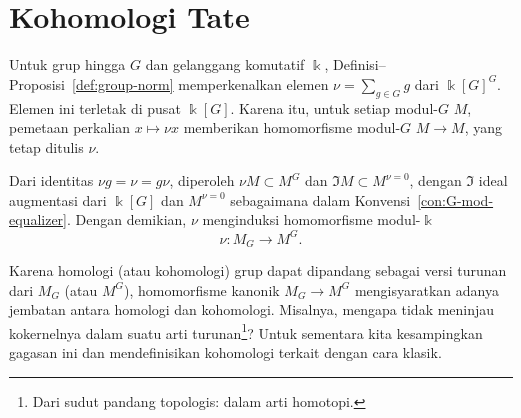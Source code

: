 
\section{Kohomologi Tate}\label{sec:Tate-coh}
\hypertarget{o014.aljabr2.chapter6.tate-cohomology}{ }

Untuk grup hingga $G$ dan gelanggang komutatif $\Bbbk$,
Definisi--Proposisi~\ref{def:group-norm} memperkenalkan elemen
$\nu = \sum_{g \in G} g$ dari $\Bbbk[G]^G$. Elemen ini terletak di pusat
$\Bbbk[G]$. Karena itu, untuk setiap modul-$G$ $M$, pemetaan perkalian
$x \mapsto \nu x$ memberikan homomorfisme modul-$G$ $M \to M$, yang tetap
ditulis $\nu$.

Dari identitas $\nu g = \nu = g \nu$, diperoleh
$\nu M \subset M^G$ dan $\mathfrak{I}M \subset M^{\nu = 0}$, dengan
$\mathfrak{I}$ ideal augmentasi dari $\Bbbk[G]$ dan $M^{\nu=0}$ sebagaimana
dalam Konvensi~\ref{con:G-mod-equalizer}. Dengan demikian, $\nu$ menginduksi
homomorfisme modul-$\Bbbk$
\begin{equation}\label{eqn:nu-coinv-inv}
	\nu: M_G \to M^G .
\end{equation}

Karena homologi (atau kohomologi) grup dapat dipandang sebagai versi turunan
dari $M_G$ (atau $M^G$), homomorfisme kanonik $M_G \to M^G$ mengisyaratkan
adanya jembatan antara homologi dan kohomologi. Misalnya, mengapa tidak
meninjau kokernelnya dalam suatu arti turunan\footnote{Dari sudut pandang
topologis: dalam arti homotopi.}? Untuk sementara kita kesampingkan gagasan
ini dan mendefinisikan kohomologi terkait dengan cara klasik.


